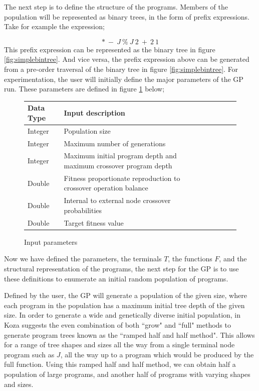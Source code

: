 \documentclass[a4paper,10.5pt]{article}
\begin{document}
\begin{text}The next step is to define the structure of the programs. Members of the population will be represented as binary trees, in the form of prefix expressions. Take for example the expression; \end{text}
\begin{equation*}*\ -\ J\ \%\ J\ 2\ +\ 2\ 1 \end{equation*} 
This prefix expression can be represented as the binary tree in figure \ref{fig:simplebintree}. And vice versa, the prefix expression above can be generated from a pre-order traversal of the binary tree in figure \ref{fig:simplebintree}. For experimentation, the user will initially define the major parameters of the GP run. These parameters are defined in figure \ref{inputparam} below;

\begin{figure}[H]
\centering
\caption{Input parameters}
\label{inputparam}
\begin{tabular}{l*{6}{l}r}
Data Type             & Input description\\
\hline
Integer & Population size\\
Integer & Maximum number of generations\\
Integer & Maximum initial program depth and maximum crossover program depth\\
Double & Fitness proportionate reproduction to crossover operation balance\\
Double & Internal to external node crossover probabilities\\
Double & Target fitness value\\
\end{tabular}
\end{figure}

Now we have defined the parameters, the terminals $T$, the functions $F$, and the structural representation of the programs, the next step for the GP is to use these definitions to enumerate an initial random population of programs.

Defined by the user, the GP will generate a population of the given size, where each program in the population has a maximum initial tree depth of the given size. In order to generate a wide and genetically diverse initial population, in \cite[p.11-14]{introgp} Koza suggests the even combination of both ``grow" and ``full" methods to generate program trees known as the ``ramped half and half method". This allows for a range of tree shapes and sizes all the way from a single terminal node program such as $J$, all the way up to a program which would be produced by the full function. Using this ramped half and half method, we can obtain half a population of large programs, and another half of programs with varying shapes and sizes.
\end{document}
